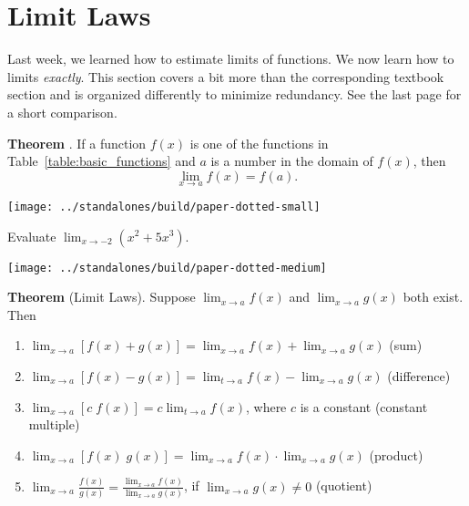 \documentclass[../main.tex]{subfiles}
\begin{document}
\section{Limit Laws}

Last week, we learned how to estimate limits of functions. We now learn how to  limits \emph{exactly}.
\faExclamationTriangle{} This section covers a bit more than the corresponding textbook section and is organized differently to minimize redundancy. See the last page for a short comparison.

\begin{mdframed}[style=simple]
  \textbf{Theorem \faStar{}}. If a function \(f(x)\) is one of the functions in Table~\ref{table:basic_functions} and \(a\) is a number in the {domain} of \(f(x)\), then
  \[
    \lim_{x \to a} f(x) = {f(a).}
  \]
\end{mdframed}
\texttt{[image: ../standalones/build/paper-dotted-small]}

\begin{example}
  Evaluate \(\lim_{x \to -2} (x^{2} + 5 x^{3})\).

  \texttt{[image: ../standalones/build/paper-dotted-medium]}
\end{example}
\clearpage


\begin{mdframed}[style=withref]
  \textbf{Theorem} (Limit Laws). Suppose \(\lim_{x \to a} f(x)\) and \(\lim_{x \to a} g(x)\) {both exist}. Then
  \begin{enumerate}[label=(\arabic*)]
    \item \(\lim_{x \to a} [f(x) + g(x)] = \lim_{x \to a} f(x) + \lim_{x \to a} g(x)\) \hfill (sum)
    \item \(\lim_{x \to a} [f(x) - g(x)] = \lim_{t \to a} f(x) - \lim_{x \to a} g(x)\) \hfill (difference)
    \item \(\lim_{x \to a} [c \; f(x)] = c \lim_{t \to a} f(x)\), where \(c\) is a constant \hfill (constant multiple)
    \item \(\lim_{x \to a} [f(x) \; g(x)] = \lim_{x \to a} f(x) \cdot \lim_{x \to a} g(x)\) \hfill (product)
    \item \(\lim_{x \to a} \frac{f(x)}{g(x)} = \frac{\lim_{x \to a} f(x)}{\lim_{x \to a} g(x)}\), \quad if {\(\lim_{x \to a}g(x) \ne 0\)} \hfill (quotient)
  \end{enumerate}
\end{mdframed}
\end{document}
